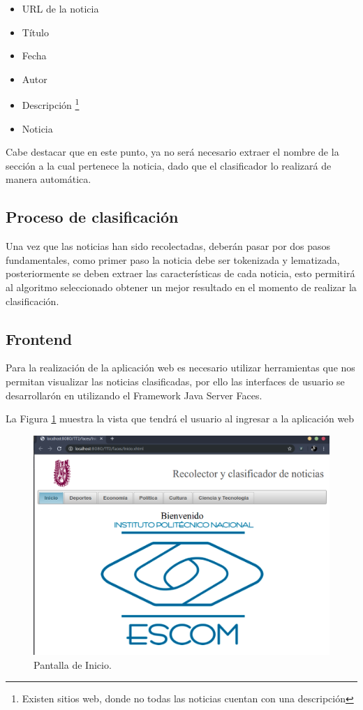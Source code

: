 \begin{itemize}
	\item URL de la noticia
	\item Título
	\item Fecha
	\item Autor
	\item Descripción \footnote{Existen sitios web, donde no todas las noticias cuentan con una descripción}
	\item Noticia
\end{itemize}

Cabe destacar que en este punto, ya no será necesario extraer el nombre de la sección a la cual pertenece la noticia, dado que el clasificador lo realizará de manera automática.\\

\subsection{Proceso de clasificación}
Una vez que las noticias han sido recolectadas, deberán pasar por dos pasos fundamentales, como primer paso la noticia debe ser tokenizada y lematizada, posteriormente se deben extraer las características de cada noticia, esto permitirá al algoritmo seleccionado obtener un mejor resultado en el momento de realizar la clasificación.

\subsection{Frontend}

Para la realización de la aplicación web es necesario utilizar herramientas que nos permitan visualizar las noticias clasificadas, por ello las interfaces de usuario se desarrollarón en utilizando el Framework Java Server Faces.

La Figura \ref{fig:PantallaInicio} muestra la vista que tendrá el usuario al ingresar a la aplicación web

\begin{figure}[ht]
\centering
\includegraphics[scale=0.3]{imagenes/Capitulo5/inicio.png}
\caption{Pantalla de Inicio.}
\label{fig:PantallaInicio}
\end{figure}

